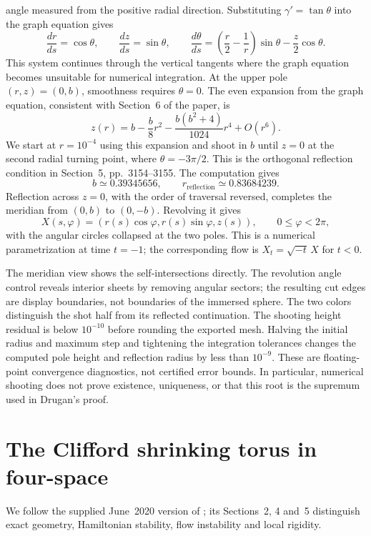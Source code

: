 \begin{example}
angle measured from the positive radial direction. Substituting
$\gamma'=\tan\theta$ into the graph equation gives
\[
 \frac{dr}{ds}=\cos\theta,\qquad
 \frac{dz}{ds}=\sin\theta,\qquad
 \frac{d\theta}{ds}
 =\left(\frac r2-\frac1r\right)\sin\theta-\frac z2\cos\theta.
\]
This system continues through the vertical tangents where the graph
equation becomes unsuitable for numerical integration. At the upper
pole $(r,z)=(0,b)$, smoothness requires $\theta=0$. The even expansion
from the graph equation, consistent with Section~6 of the paper, is
\[
 z(r)=b-\frac b8r^2-\frac{b(b^2+4)}{1024}r^4+O(r^6).
\]
We start at $r=10^{-4}$ using this expansion and shoot in $b$ until
$z=0$ at the second radial turning point, where
$\theta=-3\pi/2$. This is the orthogonal reflection condition in
Section~5, pp.~3154--3155. The computation gives
\[
 b\simeq0.39345656,\qquad r_{\mathrm{reflection}}\simeq0.83684239.
\]
Reflection across $z=0$, with the order of traversal reversed, completes
the meridian from $(0,b)$ to $(0,-b)$. Revolving it gives
\[
 X(s,\varphi)=(r(s)\cos\varphi,r(s)\sin\varphi,z(s)),
 \qquad 0\leq\varphi<2\pi,
\]
with the angular circles collapsed at the two poles. This is a numerical
parametrization at time $t=-1$; the corresponding flow is
$X_t=\sqrt{-t}\,X$ for $t<0$.

The meridian view shows the self-intersections directly. The revolution
angle control reveals interior sheets by removing angular sectors;
the resulting cut edges are display boundaries, not boundaries of the
immersed sphere. The two colors distinguish the shot half from its
reflected continuation. The shooting height residual is below $10^{-10}$
before rounding the exported mesh. Halving the initial radius and maximum
step and tightening the integration tolerances changes the computed pole
height and reflection radius by less than $10^{-9}$. These are
floating-point convergence diagnostics, not certified error bounds.
In particular, numerical shooting does not prove existence, uniqueness,
or that this root is the supremum used in Drugan's proof.
\end{example}

\chapter{The Clifford shrinking torus in four-space}\label{sec:catalogue-clifford-torus}
We follow the supplied June~2020 version of \cite{CatELS2020}; its
Sections~2, 4 and~5 distinguish exact geometry, Hamiltonian stability,
flow instability and local rigidity.

